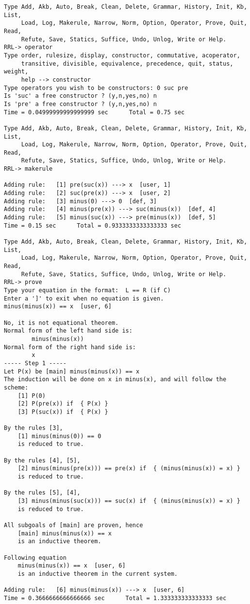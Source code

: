 \begin{verbatim}
Type Add, Akb, Auto, Break, Clean, Delete, Grammar, History, Init, Kb, List,
     Load, Log, Makerule, Narrow, Norm, Option, Operator, Prove, Quit, Read,
     Refute, Save, Statics, Suffice, Undo, Unlog, Write or Help.
RRL-> operator
Type order, rulesize, display, constructor, commutative, acoperator, 
     transitive, divisible, equivalence, precedence, quit, status, weight, 
     help --> constructor
Type operators you wish to be constructors: 0 suc pre 
Is 'suc' a free constructor ? (y,n,yes,no) n
Is 'pre' a free constructor ? (y,n,yes,no) n
Time = 0.04999999999999999 sec      Total = 0.75 sec

Type Add, Akb, Auto, Break, Clean, Delete, Grammar, History, Init, Kb, List,
     Load, Log, Makerule, Narrow, Norm, Option, Operator, Prove, Quit, Read,
     Refute, Save, Statics, Suffice, Undo, Unlog, Write or Help.
RRL-> makerule

Adding rule:   [1] pre(suc(x)) ---> x  [user, 1]
Adding rule:   [2] suc(pre(x)) ---> x  [user, 2]
Adding rule:   [3] minus(0) ---> 0  [def, 3]
Adding rule:   [4] minus(pre(x)) ---> suc(minus(x))  [def, 4]
Adding rule:   [5] minus(suc(x)) ---> pre(minus(x))  [def, 5]
Time = 0.15 sec      Total = 0.9333333333333333 sec

Type Add, Akb, Auto, Break, Clean, Delete, Grammar, History, Init, Kb, List,
     Load, Log, Makerule, Narrow, Norm, Option, Operator, Prove, Quit, Read,
     Refute, Save, Statics, Suffice, Undo, Unlog, Write or Help.
RRL-> prove
Type your equation in the format:  L == R (if C) 
Enter a ']' to exit when no equation is given.
minus(minus(x)) == x  [user, 6]

No, it is not equational theorem.
Normal form of the left hand side is:
        minus(minus(x))
Normal form of the right hand side is:
        x
----- Step 1 -----
Let P(x) be [main] minus(minus(x)) == x
The induction will be done on x in minus(x), and will follow the scheme: 
    [1] P(0)
    [2] P(pre(x)) if  { P(x) } 
    [3] P(suc(x)) if  { P(x) } 

By the rules [3],
    [1] minus(minus(0)) == 0
    is reduced to true.

By the rules [4], [5],
    [2] minus(minus(pre(x))) == pre(x) if  { (minus(minus(x)) = x) } 
    is reduced to true.

By the rules [5], [4],
    [3] minus(minus(suc(x))) == suc(x) if  { (minus(minus(x)) = x) } 
    is reduced to true.

All subgoals of [main] are proven, hence
    [main] minus(minus(x)) == x
    is an inductive theorem.

Following equation
    minus(minus(x)) == x  [user, 6]
    is an inductive theorem in the current system.

Adding rule:   [6] minus(minus(x)) ---> x  [user, 6]
Time = 0.3666666666666666 sec      Total = 1.333333333333333 sec
\end{verbatim}
\rm
\normalsize
